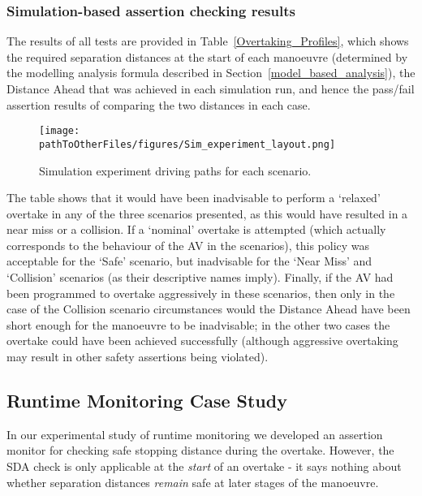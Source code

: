 \subsubsection{Simulation-based assertion checking results} \label{sim_results}

The results of all tests are provided in Table~\ref{Overtaking_Profiles}, which shows the required separation distances at the start of each manoeuvre (determined by the modelling analysis formula described in Section~\ref{model_based_analysis}), the Distance Ahead that was achieved in each simulation run, and hence the pass/fail assertion results of comparing the two distances in each case.

\begin{figure}
    \centering
    \texttt{[image: \\pathToOtherFiles/figures/Sim\_experiment\_layout.png]}
    \caption{Simulation experiment driving paths for each scenario.}
    \label{fig:Sim_experiment_layout}
\end{figure} 

The table shows that it would have been inadvisable to perform a `relaxed' overtake in any of the three scenarios presented, as this would have resulted in a near miss or a collision. If a `nominal' overtake is attempted (which actually corresponds to the behaviour of the AV in the scenarios), this policy was acceptable for the `Safe' scenario, but inadvisable for the `Near Miss' and `Collision' scenarios (as their descriptive names imply). Finally, if the AV had been programmed to overtake aggressively in these scenarios, then only in the case of the Collision scenario circumstances would the Distance Ahead have been short enough for the manoeuvre to be inadvisable; in the other two cases the overtake could have been achieved successfully (although aggressive overtaking may result in other safety assertions being violated).

\subsection{Runtime Monitoring Case Study}
In our experimental study of runtime monitoring we developed an assertion monitor for checking safe stopping distance during the overtake. However, the SDA check is only applicable at the \textit{start} of an overtake - it says nothing about whether separation distances \textit{remain} safe at later stages of the manoeuvre.

